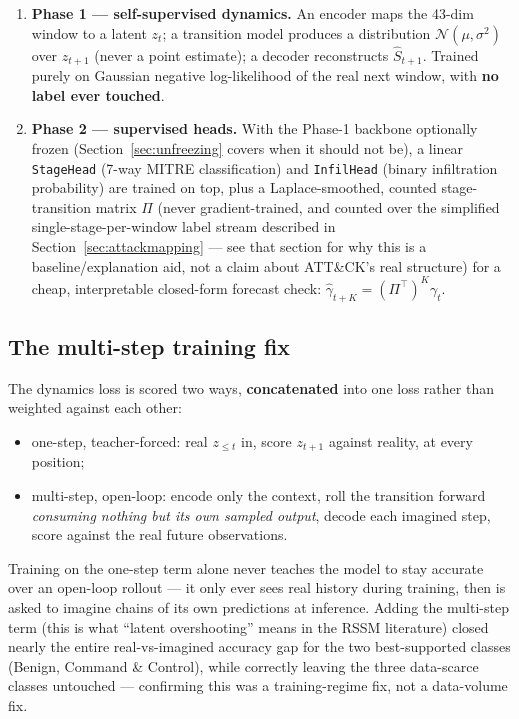 \documentclass[11pt]{article}
\newcommand{\code}[1]{\texttt{#1}}
\begin{document}
\begin{enumerate}[leftmargin=1.5em]
  \item \textbf{Phase 1 --- self-supervised dynamics.} An encoder maps the 43-dim window to a
  latent $z_t$; a transition model produces a distribution $\mathcal{N}(\mu, \sigma^2)$ over
  $z_{t+1}$ (never a point estimate); a decoder reconstructs $\hat S_{t+1}$. Trained purely on
  Gaussian negative log-likelihood of the real next window, with \textbf{no label ever touched}.
  \item \textbf{Phase 2 --- supervised heads.} With the Phase-1 backbone optionally frozen
  (Section~\ref{sec:unfreezing} covers when it should not be), a linear \code{StageHead}
  (7-way MITRE classification) and \code{InfilHead} (binary infiltration probability) are
  trained on top, plus a Laplace-smoothed, counted stage-transition matrix $\Pi$\label{sec:pi_context}
  (never gradient-trained, and counted over the simplified single-stage-per-window label stream
  described in Section~\ref{sec:attackmapping} --- see that section for why this is a
  baseline/explanation aid, not a claim about ATT\&CK's real structure) for a cheap,
  interpretable closed-form forecast check: $\hat\gamma_{t+K} = (\Pi^\top)^K \gamma_t$.
\end{enumerate}

\subsection{The multi-step training fix}\label{sec:multistep}

The dynamics loss is scored two ways, \textbf{concatenated} into one loss rather than weighted
against each other:
\begin{itemize}[leftmargin=1.5em]
  \item one-step, teacher-forced: real $z_{\le t}$ in, score $z_{t+1}$ against reality, at every
  position;
  \item multi-step, open-loop: encode only the context, roll the transition forward
  \emph{consuming nothing but its own sampled output}, decode each imagined step, score against
  the real future observations.
\end{itemize}
Training on the one-step term alone never teaches the model to stay accurate over an open-loop
rollout --- it only ever sees real history during training, then is asked to imagine chains of
its own predictions at inference. Adding the multi-step term (this is what ``latent overshooting''
means in the RSSM literature) closed nearly the entire real-vs-imagined accuracy gap for the two
best-supported classes (Benign, Command \& Control), while correctly leaving the three
data-scarce classes untouched --- confirming this was a training-regime fix, not a data-volume
fix.
\end{document}
